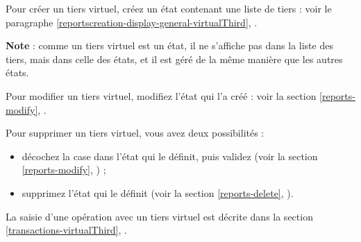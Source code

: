 Pour créer un tiers virtuel, créez un état contenant une liste de tiers : voir le paragraphe \vref{reportscreation-display-general-virtualThird}, .

\textbf{Note} : comme un tiers virtuel est un état, il ne s'affiche pas dans la liste des tiers, mais dans celle des états, et il est géré de la même manière que les autres états. 

Pour modifier un tiers virtuel, modifiez l'état qui l'a créé : voir la section \vref{reports-modify}, .

Pour supprimer un tiers virtuel, vous avez deux possibilités :

\begin{itemize}
	\item décochez la case  dans l'état qui le définit, puis validez (voir la section \vref{reports-modify}, ) ;
	\item supprimez l'état qui le définit (voir la section \vref{reports-delete}, ).
\end{itemize}

La saisie d'une opération avec un tiers virtuel est décrite dans la section \vref{transactions-virtualThird}, .


